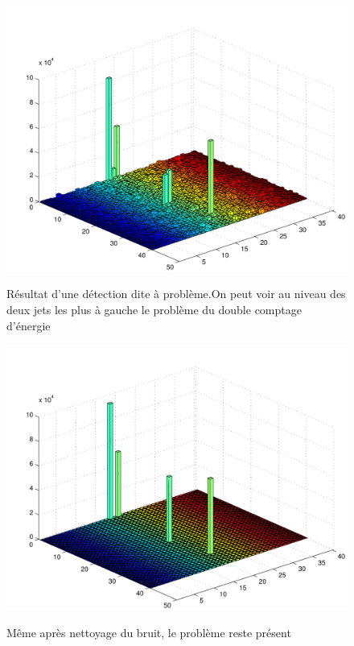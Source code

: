 \documentclass[11pt]{article}
\begin{document}
\begin{figure}
\caption{Résultat d'une détection dite à problème.\newline On peut voir au
niveau des deux jets les plus à gauche le problème du double comptage d'énergie}
\includegraphics[scale=0.55]{images/mauvaisCasBrut-eps-converted-to.pdf}
\label{pasbonb}
\end{figure}
\begin{figure}
\caption{Même après nettoyage du bruit, le problème reste présent}
\includegraphics[scale=0.55]{images/mauvaisCasNet-eps-converted-to.pdf}
\label{pasbonp}
\end{figure}
\end{document}
